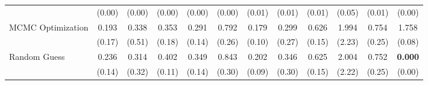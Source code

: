 \begin{table}[ht]
{\begin{tabular}{l cccc cccc cc c}
             & (0.00) & (0.00) & (0.00) & (0.00) & (0.00) & (0.01) & (0.01) & (0.01) & (0.05) & (0.01) & (0.00) \\
            \addlinespace[0.2em]
            MCMC Optimization & 0.193 & 0.338 & 0.353 & 0.291 & 0.792 & 0.179 & 0.299 & 0.626 & 1.994 & 0.754 & 1.758 \\
             & (0.17) & (0.51) & (0.18) & (0.14) & (0.26) & (0.10) & (0.27) & (0.15) & (2.23) & (0.25) & (0.08) \\
            \addlinespace[0.2em]
            Random Guess & 0.236 & 0.314 & 0.402 & 0.349 & 0.843 & 0.202 & 0.346 & 0.625 & 2.004 & 0.752 & \textbf{0.000} \\
             & (0.14) & (0.32) & (0.11) & (0.14) & (0.30) & (0.09) & (0.30) & (0.15) & (2.22) & (0.25) & (0.00) \\
            \bottomrule
        \end{tabular}%
    }
\end{table}
